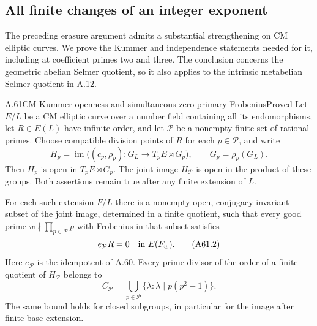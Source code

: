\subsection{All finite changes of an integer exponent}

The preceding erasure argument admits a substantial strengthening on
CM elliptic curves. We prove the Kummer and independence statements
needed for it, including at coefficient primes two and three. The
conclusion concerns the geometric abelian Selmer quotient, so it
also applies to the intrinsic metabelian Selmer quotient in A.12.

\begin{statement}{A.61}{CM Kummer openness and simultaneous zero-primary Frobenius}{Proved}
Let $E/L$ be a CM elliptic curve over a number field containing all
its endomorphisms, let $R\in E(L)$ have infinite order, and let
$\mathcal P$ be a nonempty finite set of rational primes. Choose
compatible division points of $R$ for each $p\in\mathcal P$, and
write
\[
 H_p=\operatorname{im}\bigl((c_p,\rho_p):
 G_L\longrightarrow T_pE\rtimes G_p\bigr),\qquad
 G_p=\rho_p(G_L).
 \tag{A61.1}
\]
Then $H_p$ is open in $T_pE\rtimes G_p$. The joint image
$H_{\mathcal P}$ is open in the product of these groups.
Both assertions remain true after any finite extension of $L$.

For each such extension $F/L$ there is a nonempty open,
conjugacy-invariant subset of the joint image, determined in a
finite quotient, such that every good prime $w\nmid\prod_{p\in
\mathcal P}p$ with Frobenius in that subset satisfies
\[
 e_{\mathcal P}R=0\quad\hbox{in }E(F_w).
 \tag{A61.2}
\]
Here $e_{\mathcal P}$ is the idempotent of A.60.
Every prime divisor of the order of a finite quotient of
$H_{\mathcal P}$ belongs to
\[
 C_{\mathcal P}
  =\bigcup_{p\in\mathcal P}
       \{\lambda:\lambda\mid p(p^2-1)\}.
 \tag{A61.3}
\]
The same bound holds for closed subgroups, in particular for the
image after finite base extension.
\end{statement}
